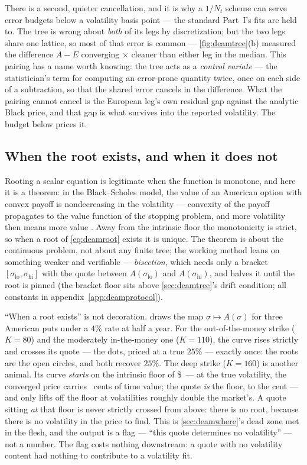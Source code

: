 There is a second, quieter cancellation, and it is why a $1/N_t$
scheme can serve error budgets below a volatility basis point --- the
standard Part~I's fits are held to.  The tree is wrong about
\emph{both} of its legs by discretization; but the two legs share one
lattice, so most of that error is common --- \cref{fig:deamtree}(b)
measured the difference $A-E$ converging
\MacDeamConvRatio$\times$ cleaner than either leg in the median.
This pairing has a name worth knowing: the tree acts as a
\emph{control variate} --- the statistician's term for computing an
error-prone quantity twice, once on each side of a subtraction, so
that the shared error cancels in the difference.  What the pairing
cannot cancel is the European leg's own residual gap against the
analytic Black price, and that gap is what survives into the reported
volatility.  The budget below prices it.

\subsection{When the root exists, and when it does not}

Rooting a scalar equation is legitimate when the function is monotone,
and here it is a theorem: in the Black--Scholes model, the value of an
American option with convex payoff is nondecreasing in the volatility
--- convexity of the payoff propagates to the value function of the
stopping problem, and more volatility then means more value
\citep{ElKarouiJeanblancShreve1998}.  Away from the intrinsic floor
the monotonicity is strict, so when a root of \eqref{eq:deamroot}
exists it is unique.  The theorem is about the continuous problem, not
about any finite tree; the working method leans on something weaker
and verifiable --- \emph{bisection}, which needs only a bracket
$[\sigma_{\text{lo}},\sigma_{\text{hi}}]$ with the quote between
$A(\sigma_{\text{lo}})$ and $A(\sigma_{\text{hi}})$, and halves it
until the root is pinned (the bracket floor sits above
\cref{sec:deamtree}'s drift condition; all constants in
appendix~\ref{app:deamprotocol}).

``When a root exists'' is not decoration.   draws
the map $\sigma\mapsto A(\sigma)$ for three American puts under a
$4\%$ rate at half a year.  For the out-of-the-money strike ($K=80$)
and the moderately in-the-money one ($K=110$), the curve rises
strictly and crosses its quote --- the dots, priced at a true $25\%$
--- exactly once: the roots are the open circles, and both recover
$25\%$.  The deep strike ($K=160$) is another animal.  Its curve
\emph{starts} on the intrinsic floor of \$\MacDeamRootDeepIntr\ ---
at the true volatility, the converged price carries
\MacDeamRootPlateauGapCents\ cents of time value; the quote \emph{is}
the floor, to the cent --- and only lifts off the floor at
volatilities roughly double the market's.  A quote sitting \emph{at}
that floor is never strictly crossed from above: there is no root,
because there is no volatility in the price to find.  This is
\cref{sec:deamwhere}'s dead zone met in the flesh, and the
output is a flag --- ``this quote determines no volatility'' ---
not a number.  The flag costs nothing downstream: a quote with no
volatility content had nothing to contribute to a volatility fit.

